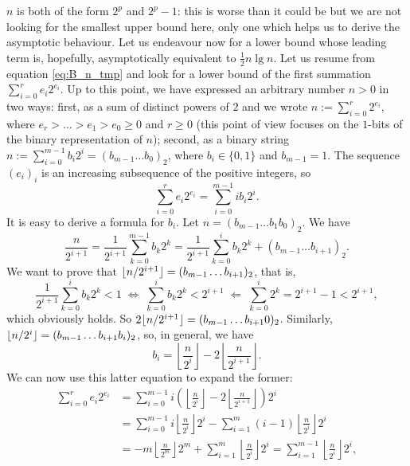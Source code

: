 \(n\) is both of the form \(2^p\) and \(2^p-1\): this is worse than it
could be but we are not looking for the smallest upper bound here,
only one which helps us to derive the asymptotic behaviour. Let us
endeavour now for a lower bound whose leading term is, hopefully,
asymptotically equivalent to \(\frac{1}{2}n \lg n\). Let us resume
from equation \eqref{eq:B_n_tmp}  and look for a
lower bound of the first summation \(\sum_{i=0}^{r}{e_i2^{e_i}}\). Up
to this point, we have expressed an arbitrary number \(n>0\) in two
ways: first, as a sum of distinct powers of \(2\) and we wrote \(n
:= \sum_{i=0}^{r}{2^{e_i}}\), where \(e_r > \ldots > e_1 > e_0
\geqslant 0\) and \(r \geqslant 0\) (this point of view focuses on the
\(1\)\hyp{}bits of the binary representation of \(n\)); second, as a
binary string \(n := \sum_{i=0}^{m-1}{b_i2^i} = (b_{m-1}\ldots
b_0)_2\), where \(b_i \in \{0,1\}\) and \(b_{m-1} = 1\). The sequence
\((e_i)_i\) is an increasing subsequence of the positive integers, so
\[
\sum_{i=0}^{r}{e_i2^{e_i}} = \sum_{i=0}^{m-1}{ib_i2^i}.
\]
It is easy to derive a formula for \(b_i\). Let \(n=(b_{m-1} \dots b_1
b_0)_2\). We have 
\begin{equation*}
\frac{n}{2^{i+1}}
= \frac{1}{2^{i+1}}\sum_{k=0}^{m-1}{b_k2^{k}}
= \frac{1}{2^{i+1}}\sum_{k=0}^{i}{b_k2^k} + (b_{m-1}\dots b_{i+1})_2.
\end{equation*}
We want to prove that \(\lfloor{n/2^{i+1}}\rfloor = (b_{m-1}\dots
b_{i+1})_2\), that is,
\[
\frac{1}{2^{i+1}}\sum_{k=0}^{i}{b_k2^k} < 1
\;\Leftrightarrow\;
\sum_{k=0}^{i}{b_k2^k} < 2^{i+1}
\;\Leftarrow\;
\sum_{k=0}^{i}{2^k} = 2^{i+1} - 1 < 2^{i+1},
\]
which obviously holds. So \(2\lfloor{n/2^{i+1}}\rfloor = (b_{m-1}\dots
b_{i+1}0)_2\). Similarly, \(\lfloor{n/2^i}\rfloor = (b_{m-1}\dots
b_{i+1}b_i)_2\), so, in general, we have
\[
b_i = \left\lfloor\frac{n}{2^i}\right\rfloor
      - 2\left\lfloor\frac{n}{2^{i+1}}\right\rfloor.
\]
We can now use this latter equation to expand the former:
\begin{align*}
\sum_{i=0}^{r}{e_i2^{e_i}}
 &= \sum_{i=0}^{m-1}{i\left(\left\lfloor\frac{n}{2^i}\right\rfloor - 2
                   \left\lfloor\frac{n}{2^{i+1}}\right\rfloor\right)2^i}\\
 &= \sum_{i=0}^{m-1}{i\left\lfloor\frac{n}{2^i}\right\rfloor2^i}
   - \sum_{i=1}^{m}{(i-1)\left\lfloor\frac{n}{2^{i}}\right\rfloor2^{i}}\\
 &= -m\left\lfloor\frac{n}{2^m}\right\rfloor 2^m
   + \sum_{i=1}^{m}{\left\lfloor\frac{n}{2^{i}}\right\rfloor2^{i}}
  = \sum_{i=1}^{m-1}{\left\lfloor\frac{n}{2^{i}}\right\rfloor2^{i},}
\end{align*}
